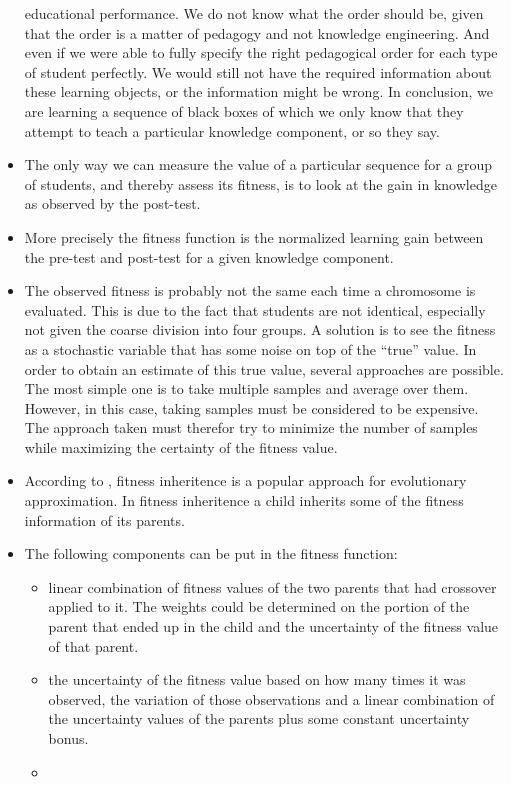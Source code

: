\begin{itemize}
		educational performance. We do not know what the order should be, given
		that the order is a matter of pedagogy and not knowledge engineering.
		And even if we were able to fully specify the right pedagogical order
		for each type of student perfectly. We would still not have the
		required information about these learning objects, or the information
		might be wrong. In conclusion, we are learning a sequence of black
		boxes of which we only know that they attempt to teach a particular
		knowledge component, or so they say.
	\item The only way we can measure the value of a particular sequence for a
		group of students, and thereby assess its fitness, is to look at the
		gain in knowledge as observed by the post-test.
	\item More precisely the fitness function is the normalized learning gain
		between the pre-test and post-test for a given knowledge component.
	\item The observed fitness is probably not the same each time a chromosome
		is evaluated. This is due to the fact that students are not identical,
		especially not given the coarse division into four groups. A solution
		is to see the fitness as a stochastic variable that has some noise on
		top of the ``true'' value. In order to obtain an estimate of this true
		value, several approaches are possible. The most simple one is to take
		multiple samples and average over them. However, in this case, taking
		samples must be considered to be expensive. The approach taken must
		therefor try to minimize the number of samples while maximizing the
		certainty of the fitness value.
	\item According to \citet{Jin2005}, fitness inheritence is a popular approach for evolutionary approximation. In fitness inheritence a child inherits some of the fitness information of its parents.
	\item The following components can be put in the fitness function:
		\begin{itemize}
			\item linear combination of fitness values of the two parents that
				had crossover applied to it. The weights could be determined on
				the portion of the parent that ended up in the child and the
				uncertainty of the fitness value of that parent.
			\item the uncertainty of the fitness value based on how many times
				it was observed, the variation of those observations and a
				linear combination of the uncertainty values of the parents
				plus some constant uncertainty bonus.
			\item 
		\end{itemize}
\end{itemize}
